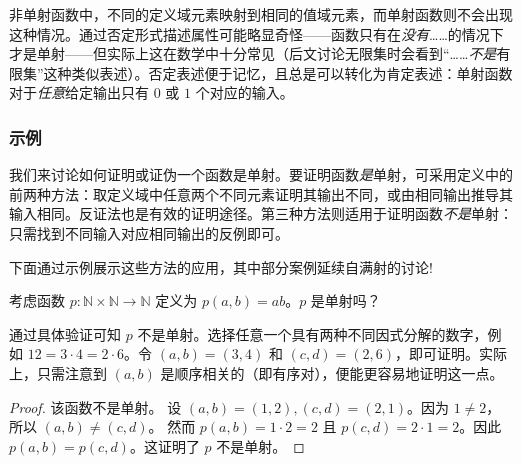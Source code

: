 \begin{multicols}{2}
\begin{center}
    \end{center}
\end{multicols}

非单射函数中，不同的定义域元素映射到相同的值域元素，而单射函数则不会出现这种情况。通过否定形式描述属性可能略显奇怪——函数只有在\emph{没有}……的情况下才是单射——但实际上这在数学中十分常见（后文讨论无限集时会看到``……\emph{不是}有限集''这种类似表述）。否定表述便于记忆，且总是可以转化为肯定表述：单射函数对于\emph{任意}给定输出只有 $0$ 或 $1$ 个对应的输入。

\subsubsection*{示例}

我们来讨论如何证明或证伪一个函数是单射。要证明函数\emph{是}单射，可采用定义中的前两种方法：取定义域中任意两个不同元素证明其输出不同，或由相同输出推导其输入相同。反证法也是有效的证明途径。第三种方法则适用于证明函数\emph{不是}单射：只需找到不同输入对应相同输出的反例即可。

下面通过示例展示这些方法的应用，其中部分案例延续自满射的讨论!\\

\begin{example}
    考虑函数 $p : \mathbb{N} \times \mathbb{N} \to \mathbb{N}$ 定义为 $p(a,b) = ab$。$p$ 是单射吗？

    通过具体验证可知 $p$ 不是单射。选择任意一个具有两种不同因式分解的数字，例如 $12 = 3 \cdot 4 = 2 \cdot 6$。令 $(a, b) = (3, 4)$ 和 $(c, d) = (2, 6)$，即可证明。实际上，只需注意到 $(a, b)$ 是顺序相关的（即有序对），便能更容易地证明这一点。

    \begin{proof}
        该函数不是单射。
        设 $ (a, b) = (1, 2), (c, d) = (2, 1)$。因为 $1 \ne 2$，所以 $ (a, b) \ne (c, d)$。
        然而 $p(a, b) = 1 \cdot 2 = 2$ 且 $p(c, d) = 2 \cdot 1 = 2$。因此 $p(a, b) = p(c, d)$。这证明了 $p$ 不是单射。
    \end{proof}
\end{example}

